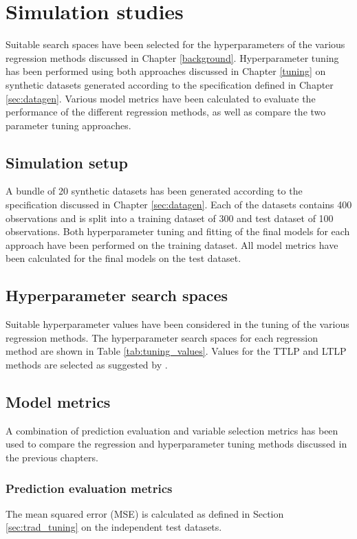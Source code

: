\chapter{Simulation studies}
Suitable search spaces have been selected for the hyperparameters of the various regression methods discussed in Chapter \ref{background}. Hyperparameter tuning has been performed using both approaches discussed in Chapter \ref{tuning} on synthetic datasets generated according to the specification defined in Chapter \ref{sec:datagen}. Various model metrics have been calculated to evaluate the performance of the different regression methods, as well as compare the two parameter tuning approaches.


\section{Simulation setup}
A bundle of 20 synthetic datasets has been generated according to the specification discussed in Chapter \ref{sec:datagen}. Each of the datasets contains 400 observations and is split into a training dataset of 300 and test dataset of 100 observations. Both hyperparameter tuning and fitting of the final models for each approach have been performed on the training dataset. All model metrics have been calculated for the final models on the test dataset.


\section{Hyperparameter search spaces}
Suitable hyperparameter values have been considered in the tuning of the various regression methods. The hyperparameter search spaces for each regression method are shown in Table \ref{tab:tuning_values}. Values for the TTLP and LTLP methods are selected as suggested by \cite{kim2013network}.



\section{Model metrics}
A combination of prediction evaluation and variable selection metrics has been used to compare the regression and hyperparameter tuning methods discussed in the previous chapters.

\subsection{Prediction evaluation metrics}
The mean squared error (MSE) is calculated as defined in Section \ref{sec:trad_tuning} on the independent test datasets. 


